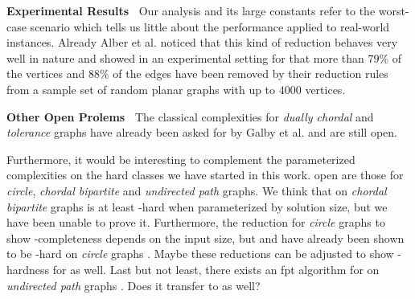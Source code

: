 \noindent \textbf{Experimental Results~}
Our analysis and its large constants refer to the worst-case scenario which tells us little about the performance applied to real-world instances.
Already Alber et al. \cite{Alber2004} noticed that this kind of reduction behaves very well in nature and showed in an experimental setting for \pdom that more than $79\%$ of the vertices and $88\%$ of the edges have been removed by their reduction rules from a sample set of random planar graphs with up to $4000$ vertices. 

\noindent \textbf{Other Open Prolems~}
The classical complexities for \textit{dually chordal} and \textit{tolerance} graphs have already been asked for by Galby et al. \cite{Galby2020} and are still open.

Furthermore, it would be interesting to complement the parameterized complexities on the hard classes we have started in this work.
open are those for \textit{circle}, \textit{chordal bipartite} and \textit{undirected path} graphs.
We think that \sdoms on \textit{chordal bipartite} graphs is at least \WONEhs-hard when parameterized by solution size, but we have been unable to prove it.
Furthermore, the reduction for \textit{circle} graphs \cite{Kloks2021} to show \NP-completeness depends on the input size, but \doms and \tdoms have already been shown to be \WONEhs-hard on \textit{circle} graphs \cite{Bousquet2012}. 
Maybe these reductions can be adjusted to show \WONEhs-hardness for \sdoms as well.
Last but not least, there exists an fpt algorithm for \doms on \textit{undirected path} graphs \cite{Figueiredo2022}. 
Does it transfer to \sdoms as well?

